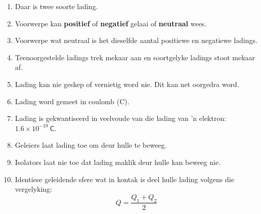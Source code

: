 \begin{enumerate}[noitemsep, label=\textbf{\arabic*}. ] 
\item Daar is twee soorte lading.
\item Voorwerpe kan \textbf{positief} of \textbf{negatief} gelaai of \textbf{neutraal} wees.
\item Voorwerpe wat neutraal is het dieselfde aantal positiewe en negatiewe ladings.
\item Teenoorgestelde ladings trek mekaar aan en soortgelyke ladings stoot mekaar af.
\item Lading kan nie geskep of vernietig word nie. Dit kan net oorgedra word.
\item Lading word gemeet in coulomb (C).
\item Lading is gekwantiseerd in veelvoude van die lading van 'n elektron: $1.6\times10^{-19}~\mathsf{C}$.
\item Geleiers laat lading toe om deur hulle te beweeg. 
\item Isolators laat nie toe dat lading maklik deur hulle kan beweeg nie.
\item Identiese geleidende sfere wat in kontak is deel hulle lading volgens die vergelyking:
\begin{equation*}
 Q=\frac{Q_1+Q_2}{2}
\end{equation*}
\end{enumerate}
        

